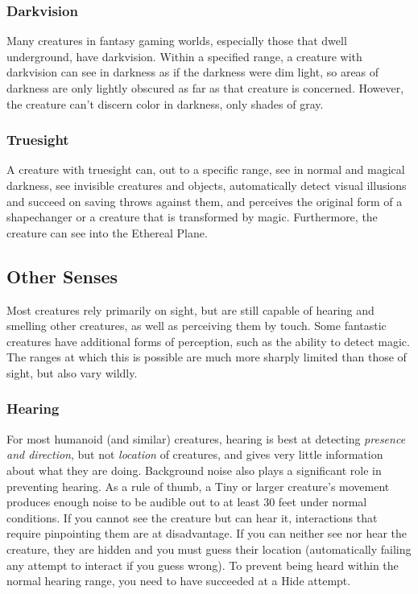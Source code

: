 \subsubsection{Darkvision}

Many creatures in fantasy gaming worlds, especially those that dwell underground, have darkvision. Within a specified range, a creature with darkvision can see in darkness as if the darkness were dim light, so areas of darkness are only lightly obscured as far as that creature is concerned. However, the creature can't discern color in darkness, only shades of gray.

\subsubsection{Truesight}

A creature with truesight can, out to a specific range, see in normal and magical darkness, see invisible creatures and objects, automatically detect visual illusions and succeed on saving throws against them, and perceives the original form of a shapechanger or a creature that is transformed by magic. Furthermore, the creature can see into the Ethereal Plane.

\subsection{Other Senses}
Most creatures rely primarily on sight, but are still capable of hearing and smelling other creatures, as well as perceiving them by touch. Some fantastic creatures have additional forms of perception, such as the ability to detect magic. The ranges at which this is possible are much more sharply limited than those of sight, but also vary wildly.

\subsubsection{Hearing}
For most humanoid (and similar) creatures, hearing is best at detecting \textit{presence and direction}, but not \textit{location} of creatures, and gives very little information about what they are doing. Background noise also plays a significant role in preventing hearing. As a rule of thumb, a Tiny or larger creature's movement produces enough noise to be audible out to at least 30 feet under normal conditions. If you cannot see the creature but can hear it, interactions that require pinpointing them are at disadvantage. If you can neither see nor hear the creature, they are hidden and you must guess their location (automatically failing any attempt to interact if you guess wrong). To prevent being heard within the normal hearing range, you need to have succeeded at a Hide attempt. 

